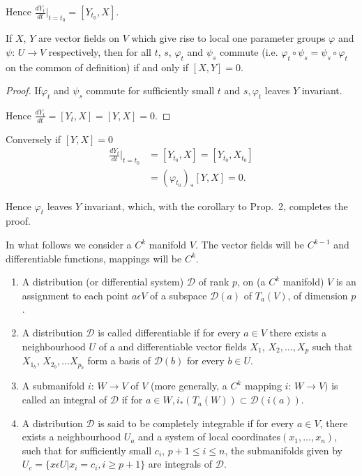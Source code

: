 Hence $\frac{d Y_t}{dt} |_{t = t_0} = [ Y_{t_0}, X]$.

\begin{coro*}
  If $X$, $Y$ are vector fields on $V$ which give rise to local one
  parameter groups $\varphi$ and $\psi$: $U \to V$ respectively, then
  for all $t$, $s$, $\varphi_t	$ and $\psi_s$ commute
  (i.e. $\varphi_t \circ \psi_s = \psi_s \circ \varphi_t$ on the common of
  definition) if and only if $[X, Y] = 0$. 
\end{coro*}

\begin{proof}
  If\pageoriginale $\varphi_t$ and $\psi_s$ commute for sufficiently small $t$ and
  $s, \varphi_t$ leaves $Y$ invariant. 
  
  Hence \hspace{2cm} $\frac{d Y_t}{dt} = [Y_t, X] = [Y, X] = 0.$\hfil 
\end{proof}

Conversely if $[Y, X] = 0$
\begin{align*}
  \frac{d Y_t}{dt} \bigg|_{t = t_0} & = [Y_{t_0}, X] = [Y_{t_0}, X_{t_0}] \\
  & =(\varphi_{t_0})_* [Y, X] = 0.
\end{align*}

Hence $\varphi_t$ leaves $Y$ invariant, which, with the corollary to
Prop.~2, completes the proof. 

In what follows we consider a $C^k$ manifold $V$. The vector fields
will be $C^{k-1}$ and differentiable functions, mappings will be
$C^k$. 

\begin{defi*}
  \begin{enumerate}
  \item  A distribution (or differential system) $\mathscr{D}$ of
    rank $p$, on (a $C^k$ manifold) $V$ is an assignment to each point
    $a \epsilon V$ of a subspace $\mathscr{D}(a)$ of $T_a(V)$, of
    dimension $p$. 
  \item A distribution $\mathscr{D}$ is called differentiable if for
    every $a \in V$ there exists a neighbourhood $U$ of a and
    differentiable vector fields $X_1$, $X_2, \ldots , X_p$ such that
    $X_{1_b}$, $X_{2_b}, \ldots X_{p_b}$ form a basis of
    $\mathscr{D}(b)$ for every $b \in U$. 
  \item A submanifold $i$: $W \to V$ of $V$ (more generally, a $C^k$
    mapping $i$: $W \to V)$ is called an integral of $\mathscr{D}$ if
    for $a \in W, i_* (T_a(W)) \subset \mathscr{D}(i(a))$. 
  \item A distribution $\mathscr{D}$ is said to be completely
    integrable if for every $a \in V$, there exists a neighbourhood
    $U_a$ and a system of local coordinates\pageoriginale $(x_1, \ldots, x_n)$, such
    that for sufficiently small $c_i$, $p+1 \leq i \leq n$, the
    submanifolds given by $U_c = \{x \epsilon U | x_i = c_i, i \geq
    p+1 \}$ are integrals of $\mathscr{D}$. 
  \end{enumerate}
\end{defi*}

